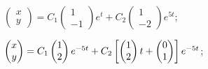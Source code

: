 \begin{enumsolsfull}
		\label{sol:linsys_hmg:simple2d_part2}
		\item \( \begin{pmatrix} x \\ y \end{pmatrix} = C_1 \begin{pmatrix} 1 \\ -1 \end{pmatrix} e^{t} + C_2 \begin{pmatrix} 1 \\ -2 \end{pmatrix} e^{5t} \); %
		\item \( \begin{pmatrix} x \\ y \end{pmatrix} = C_1 \begin{pmatrix} 1 \\ 2 \end{pmatrix} e^{-5t} + C_2 \left[ \begin{pmatrix} 1 \\ 2 \end{pmatrix}t + \begin{pmatrix} 0 \\ 1 \end{pmatrix} \right] e^{-5t} \); %

\end{enumsolsfull}
